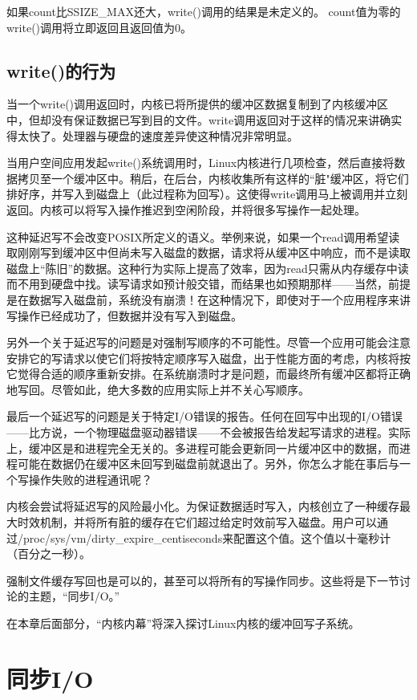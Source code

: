 如果count比SSIZE\_MAX还大，write()调用的结果是未定义的。 count值为零的write()调用将立即返回且返回值为0。 

\subsection{write()的行为}
当一个write()调用返回时，内核已将所提供的缓冲区数据复制到了内核缓冲区中，但却没有保证数据已写到目的文件。write调用返回对于这样的情况来讲确实得太快了。处理器与硬盘的速度差异使这种情况非常明显。

当用户空间应用发起write()系统调用时，Linux内核进行几项检查，然后直接将数据拷贝至一个缓冲区中。稍后，在后台，内核收集所有这样的“脏"缓冲区，将它们排好序，并写入到磁盘上（此过程称为回写）。这使得write调用马上被调用并立刻返回。内核可以将写入操作推迟到空闲阶段，并将很多写操作一起处理。

这种延迟写不会改变POSIX所定义的语义。举例来说，如果一个read调用希望读取刚刚写到缓冲区中但尚未写入磁盘的数据，请求将从缓冲区中响应，而不是读取磁盘上“陈旧”的数据。这种行为实际上提高了效率，因为read只需从内存缓存中读而不用到硬盘中找。读写请求如预计般交错，而结果也如预期那样——当然，前提是在数据写入磁盘前，系统没有崩溃！在这种情况下，即使对于一个应用程序来讲写操作已经成功了，但数据并没有写入到磁盘。

另外一个关于延迟写的问题是对强制写顺序的不可能性。尽管一个应用可能会注意安排它的写请求以使它们将按特定顺序写入磁盘，出于性能方面的考虑，内核将按它觉得合适的顺序重新安排。在系统崩溃时才是问题，而最终所有缓冲区都将正确地写回。尽管如此，绝大多数的应用实际上并不关心写顺序。

最后一个延迟写的问题是关于特定I/O错误的报告。任何在回写中出现的I/O错误——比方说，一个物理磁盘驱动器错误——不会被报告给发起写请求的进程。实际上，缓冲区是和进程完全无关的。多进程可能会更新同一片缓冲区中的数据，而进程可能在数据仍在缓冲区未回写到磁盘前就退出了。另外，你怎么才能在事后与一个写操作失败的进程通讯呢？

内核会尝试将延迟写的风险最小化。为保证数据适时写入，内核创立了一种缓存最大时效机制，并将所有脏的缓存在它们超过给定时效前写入磁盘。用户可以通过/proc/sys/vm/dirty\_expire\_centiseconds来配置这个值。这个值以十毫秒计（百分之一秒）。

强制文件缓存写回也是可以的，甚至可以将所有的写操作同步。这些将是下一节讨论的主题，“同步I/O。”

在本章后面部分，“内核内幕”将深入探讨Linux内核的缓冲回写子系统。 

\section{同步I/O}

